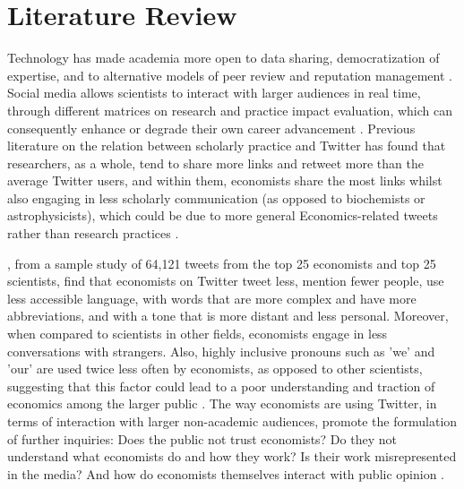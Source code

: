 \documentclass[12pt,english]{article}
\begin{document}
\section{Literature Review}\label{sec:litreview}
Technology has made academia more open to data sharing, democratization of expertise, and to alternative models of peer review and reputation management \citep{social.2014}. Social media allows scientists to interact with larger audiences in real time, through different matrices on research and practice impact evaluation, which can consequently enhance or degrade their own career advancement \citep{nyt.2012}. Previous literature on the relation between scholarly practice and Twitter has found that researchers, as a whole, tend to share more links and retweet more than the average Twitter users, and within them, economists share the most links whilst also engaging in less scholarly communication (as opposed to biochemists or astrophysicists), which could be due to more general Economics-related tweets rather than research practices \citep{holmberg.2014}. 

\cite{giusta.2018}, from a sample study of 64,121 tweets from the top 25 economists and top 25 scientists, find that economists on Twitter tweet less, mention fewer people, use less accessible language, with words that are more complex and have more abbreviations, and with a tone that is more distant and less personal. Moreover, when compared to scientists in other fields, economists engage in less conversations with strangers. Also, highly inclusive pronouns such as 'we' and 'our' are used twice less often by economists, as opposed to other scientists, suggesting that this factor could lead to a poor understanding and traction of economics among the larger public \citep{giusta.2018}. The way economists are using Twitter, in terms of interaction with larger non-academic audiences, promote the formulation of further inquiries: Does the public not trust economists? Do they not understand what economists do and how they work? Is their work misrepresented in the media? And how do economists themselves interact with public opinion \citep{t.economists}. 
\end{document}
